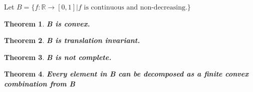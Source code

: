 \documentclass[12pt]{extarticle}
\theoremstyle{plain}
\newtheorem{thm}{Theorem}[section]
\theoremstyle{Definition}
\theoremstyle{Definition}
\theoremstyle{plain}
\begin{document}
	Let $B = \{f : \mathbb{R} \to [0,1] | f \text{ is continuous and non-decreasing.}\}$ \\ 
	\begin{thm} \textbf{B is convex. } \\
		
	\end{thm}
	\begin{thm} \textbf{B is translation invariant.} \\
	
	\end{thm}
	\begin{thm} \textbf{B is not complete.} \\
	
	\end{thm}
	\begin{thm} \textbf{Every element in B can be decomposed as a finite convex combination from B} \\
	
	\end{thm}
\end{document}
